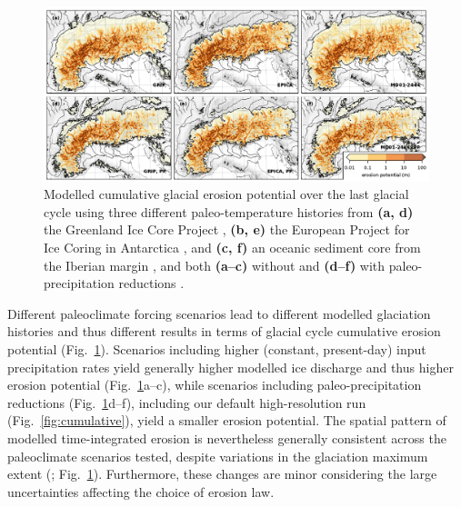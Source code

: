 \documentclass[esurf, manuscript]{copernicus}
\begin{document}
    \begin{figure}
      \centerline{\includegraphics{alpero_sensitivity}}
      \caption{%
        Modelled cumulative glacial erosion potential over the last glacial
        cycle using three different paleo-temperature histories from
        \textbf{(a, d)} the Greenland Ice Core Project
        \citep[GRIP;][]{Dansgaard.etal.1993}, \textbf{(b, e)} the European
        Project for Ice Coring in Antarctica \citep[our default,
        EPICA;][]{Jouzel.etal.2007}, and \textbf{(c, f)} an oceanic sediment
        core from the Iberian margin \citep[MD01-2444;][]{Martrat.etal.2007},
        and both \textbf{(a--c)} without and \textbf{(d--f)} with
        paleo-precipitation reductions \citep[cf.][]{Seguinot.etal.2018}.}
      \label{fig:sensitivity}
    \end{figure}

    Different paleoclimate forcing scenarios lead to different modelled
    glaciation histories \citep[cf.][]{Seguinot.etal.2018} and thus different
    results in terms of glacial cycle cumulative erosion
    potential (Fig.~\ref{fig:sensitivity}). Scenarios including higher
    (constant, present-day) input precipitation rates yield generally higher
    modelled ice discharge and thus higher
    erosion potential (Fig.~\ref{fig:sensitivity}a--c), while scenarios
    including paleo-precipitation reductions (Fig.~\ref{fig:sensitivity}d--f),
    including our default high-resolution run
    (Fig.~\ref{fig:cumulative}), yield a smaller erosion potential. The spatial
    pattern of modelled time-integrated erosion is nevertheless generally
    consistent across the paleoclimate scenarios tested,
    despite variations in the glaciation maximum extent
    (\citealp[Fig.~3 in][]{Seguinot.etal.2018}; Fig.~\ref{fig:sensitivity}).
    Furthermore, these changes are minor
    considering the large uncertainties affecting the choice of erosion law.

\end{document}
